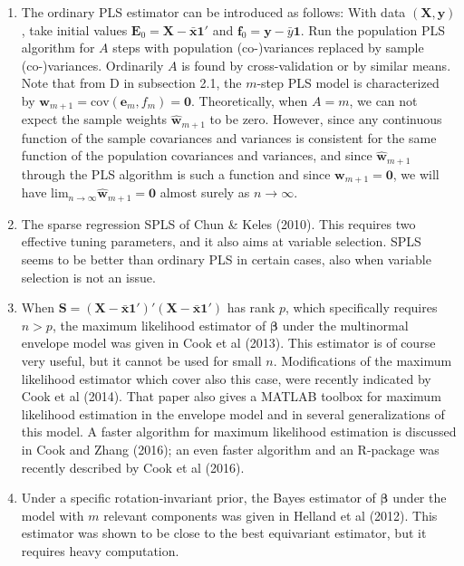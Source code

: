 \documentclass[a4paper, 11pt]{article}
\begin{document}
\begin{enumerate}[label=\alph*.]

\item The ordinary PLS estimator can be introduced as follows: With data $(\bm{X},\bm{y})$, take initial values $\bm{E}_{0}=\bm{X}-\bar{\bm{x}}\bm{1}'$ 
  and $\bm{f}_{0}=\bm{y}-\bar{y}\bm{1}$. Run the population PLS algorithm for $A$ steps with population (co-)variances replaced by sample (co-)variances. 
  Ordinarily $A$ is found by cross-validation or by similar means. Note that from D in subsection 2.1, the $m$-step PLS model is characterized by $\bm{w}_{m+1}=\mathrm{cov}(\bm{e}_m,f_m)=\bm{0}$. Theoretically, when $A=m$, we can not expect the sample weights $\widehat{\bm{w}}_{m+1}$ 
  to be zero. However, since any continuous function of the sample covariances and variances is consistent for the same function of the 
  population covariances and variances, and since  $\widehat{\bm{w}}_{m+1}$ through the PLS algorithm is such a function and since $\bm{w}_{m+1}=\bm{0}$, we will have ${\mathrm{lim}_{n\rightarrow\infty}}\widehat{\bm{w}}_{m+1}=\bm{0}$ almost surely as $n\rightarrow\infty$.
  \smallskip

\item The sparse regression SPLS of Chun \& Keles (2010). This requires two effective tuning parameters, and it also aims at variable selection. SPLS seems to be better than ordinary PLS in certain cases, also when variable selection is not an issue.
  \smallskip

\item When $\bm{S}=(\bm{X}-\bar{\bm{x}}\bm{1}')'(\bm{X}-\bar{\bm{x}}\bm{1}')$ has rank $p$, which specifically requires $n>p$, the maximum likelihood 
  estimator of $\bm{\beta}$ under the multinormal envelope model was given in Cook et al (2013). This estimator is of course very useful, but it cannot be used for small $n$. Modifications of the maximum likelihood estimator which cover also this case, were recently indicated by Cook et al (2014). That paper also gives a MATLAB toolbox for maximum likelihood estimation in the envelope model and in several generalizations of this model. A faster algorithm for maximum likelihood estimation is discussed in Cook and Zhang (2016); an even faster algorithm and an R-package was recently described by Cook et al (2016).
  \smallskip

\item Under a specific rotation-invariant prior, the Bayes estimator of $\bm{\beta}$ under the model with $m$ relevant components was given in Helland et al 
  (2012). This estimator was shown to be close to the best equivariant estimator, but it requires heavy computation.
  \smallskip
  
\end{enumerate}
\end{document}
